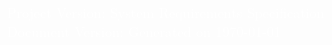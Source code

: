 \begin{flushright}
    \begin{bfseries}
    \begin{centering}
        \vspace{-1cm}
        \textcolor{white}{{\fontsize{50}{50}\selectfont{}}}\\
    \end{centering}
    \end{bfseries}
        

        
\vfill
\textcolor{white}{Project Version: \projectversion \hfill System Requirements Specification} \\
\textcolor{white}{Document Version: \documentversion \hfill Generated on \today} \\
\end{flushright}

\BgThispage
